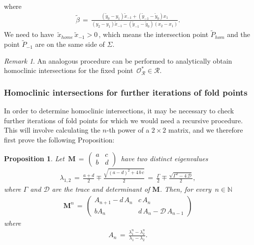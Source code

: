 \documentclass{article}
\theoremstyle{example}
\theoremstyle{plain}
\newtheorem{proposition}[theorem]{Proposition}
\theoremstyle{definition}
\theoremstyle{remark}
\newtheorem{remark}[theorem]{Remark}
\def\mM{{\bm{M}}}
\begin{document}
where 
\begin{align}
\tilde{\beta} \, = \, \frac{(\tilde{y}_0-y_1)\tilde{x}_{-1}+(\tilde{y}_{-1}-\tilde{y}_0)x_1}{(y_2-y_1)\tilde{x}_{-1}-(\tilde{y}_{-1}-\tilde{y}_0)(x_2-x_1)}.    
\end{align}
We need to have $\, \tilde{x}_{home}\, \tilde{x}_{-1} >0 \,$, which means the intersection point $\tilde{P}_{hom}$ and the point $\tilde{P}_{-1}$ are on the same side of $\Sigma$.
\begin{remark}
An analogous procedure can be performed to analytically obtain homoclinic intersections for the fixed point $\, \mathcal{O}^{*}_{\mathcal{R}}\in \mathcal{R}$. 
\end{remark}
\subsubsection{Homoclinic intersections for further iterations of fold points} 
In order to determine homoclinic intersections, it may be necessary to check further iterations of fold points for which we would need a recursive procedure. This will involve calculating the $n$-th power of a $2\times 2$ matrix, and we therefore first prove the following Proposition: \\ 
\begin{proposition}\label{pro-1}
Let $\,\mM \, = \, \begin{pmatrix}
a & c \\[1ex]
b & d
\end{pmatrix}\,$ have two distinct eigenvalues
\begin{align}\label{}
\lambda_{1,2} \, = \, \frac{a+d}{2} \mp \frac{\sqrt{(a-d)^2+4\, b \, c}}{2} \, = \, \frac{\Gamma}{2} \mp \frac{\sqrt{\Gamma^2-4\,\mathcal{D}}}{2},   
\end{align}
where $\Gamma$ and $\mathcal{D}$ are the trace and determinant of $\mM$. Then, for every $\,n \in \mathbb{N}$\\
\begin{align}\label{M-n}
\mM^n \, = \, 
%
\begin{pmatrix}
A_{n+1} -d\,A_n & c\, A_n \\[1ex]
%
b A_n &  d\,A_n - \mathcal{D}\, A_{n-1}
\end{pmatrix}
\end{align}
where 
\begin{align}\label{An}
A_n \, = \,\frac{\lambda_1^n-\lambda_2^n}{\lambda_1 - \lambda_2}.
\end{align}
%
\end{proposition}
\end{document}
